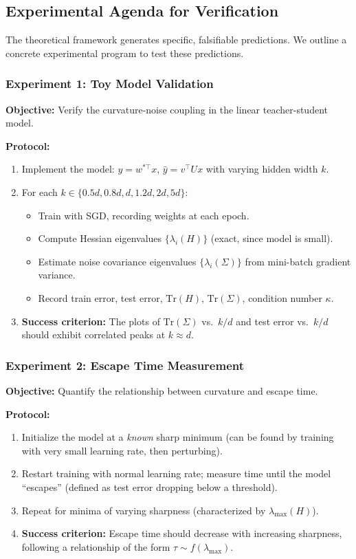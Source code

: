 \documentclass[
  journal=largetwo,
  simfonts=false,
  year=2025,
  volume=37,
]{cup-journal}
\begin{document}
\subsection{Experimental Agenda for Verification}\label{sec:experimental_agenda}

The theoretical framework generates specific, falsifiable predictions. We outline a concrete experimental program to test these predictions.

\subsubsection{Experiment 1: Toy Model Validation}

\textbf{Objective:} Verify the curvature-noise coupling in the linear teacher-student model.

\textbf{Protocol:}
\begin{enumerate}
    \item Implement the model: $y = w^{*\top} x$, $\hat{y} = v^\top U x$ with varying hidden width $k$.
    \item For each $k \in \{0.5d, 0.8d, d, 1.2d, 2d, 5d\}$:
    \begin{itemize}
        \item Train with SGD, recording weights at each epoch.
        \item Compute Hessian eigenvalues $\{\lambda_i(H)\}$ (exact, since model is small).
        \item Estimate noise covariance eigenvalues $\{\lambda_i(\Sigma)\}$ from mini-batch gradient variance.
        \item Record train error, test error, $\text{Tr}(H)$, $\text{Tr}(\Sigma)$, condition number $\kappa$.
    \end{itemize}
    \item \textbf{Success criterion:} The plots of $\text{Tr}(\Sigma)$ vs.\ $k/d$ and test error vs.\ $k/d$ should exhibit correlated peaks at $k \approx d$.
\end{enumerate}

\subsubsection{Experiment 2: Escape Time Measurement}

\textbf{Objective:} Quantify the relationship between curvature and escape time.

\textbf{Protocol:}
\begin{enumerate}
    \item Initialize the model at a \textit{known} sharp minimum (can be found by training with very small learning rate, then perturbing).
    \item Restart training with normal learning rate; measure time until the model ``escapes'' (defined as test error dropping below a threshold).
    \item Repeat for minima of varying sharpness (characterized by $\lambda_{\max}(H)$).
    \item \textbf{Success criterion:} Escape time should decrease with increasing sharpness, following a relationship of the form $\tau \sim f(\lambda_{\max})$.
\end{enumerate}
\end{document}
